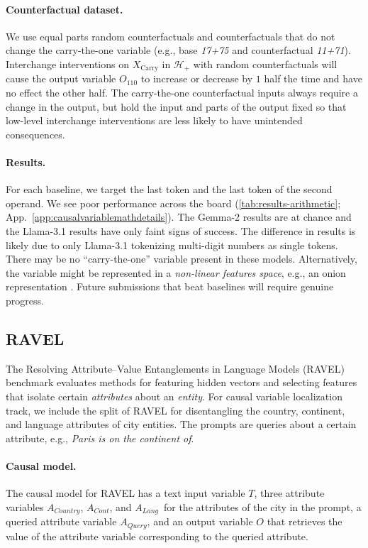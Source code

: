 \documentclass{article}
\theoremstyle{plain}
\theoremstyle{definition}
\theoremstyle{remark}
\newcommand{\carry}{X_{\text{Carry}}}
\newcommand{\continent}{$A_{\mathit{Cont}}$}
\newcommand{\country}{$A_{\mathit{Country}}$}
\newcommand{\lang}{$A_{\mathit{Lang}}$}
\newcommand{\queryvar}{A_{\mathit{Query}}}
\newcommand{\inputvar}{T}
\newcommand{\outputvar}{O}
\begin{document}
\paragraph{Counterfactual dataset.}
We use equal parts random counterfactuals and counterfactuals that do not change the carry-the-one variable (e.g., base \textit{17+75} and counterfactual \textit{11+71}).
Interchange interventions on $\carry$ in $\mathcal{H}_+$ with random counterfactuals will cause the output variable $O_{110}$ to increase or decrease by $1$ half the time and have no effect the other half. 
The carry-the-one counterfactual inputs always require a change in the output, but hold the input and parts of the output fixed so that low-level interchange interventions are less likely to have unintended consequences.

\paragraph{Results.}
For each baseline, we target the last token and the last token of the second operand. We see poor performance across the board (\cref{tab:results-arithmetic}; App.~\ref{app:causalvariablemathdetails}). The Gemma-2 results are at chance and the Llama-3.1 results have only faint signs of success. The difference in results is likely due to only Llama-3.1 tokenizing multi-digit numbers as single tokens. There may be no ``carry-the-one'' variable present in these models. Alternatively, the variable might be represented in a \textit{non-linear features space}, e.g., an onion representation \cite{csordas2024recurrent}. Future submissions that beat baselines will require genuine progress.

\subsection{RAVEL}
The Resolving Attribute–Value Entanglements in Language Models (RAVEL) benchmark \cite{huang-etal-2024-ravel} evaluates methods for featuring hidden vectors and selecting features that isolate certain \textit{attributes} about an \textit{entity}. For causal variable localization track, we include the split of RAVEL for disentangling the country, continent, and language attributes of city entities. The prompts are queries about a certain attribute, e.g., \textit{Paris is on the continent of}. 

\paragraph{Causal model.} The causal model for RAVEL has a text input variable $\inputvar$, three attribute variables \country, \continent, and \lang\ for the attributes of the city in the prompt, a queried attribute variable $\queryvar$, and an output variable $\outputvar$ that retrieves the value of the attribute variable corresponding to the queried attribute. 
\end{document}
